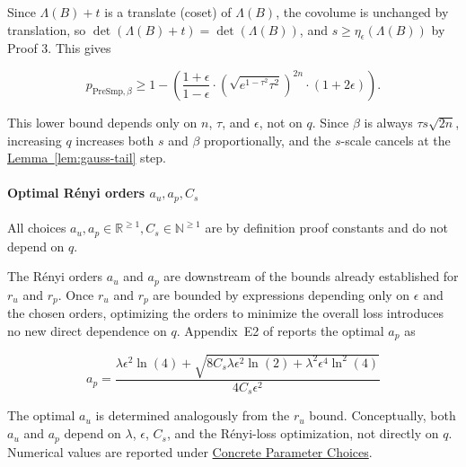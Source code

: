 Since \(\Lambda(B) + t\) is a translate (coset) of \(\Lambda(B)\), the
covolume is unchanged by translation, so
\(\det(\Lambda(B)+t) = \det(\Lambda(B))\), and
\(s \ge \eta_\epsilon(\Lambda(B))\) by Proof 3. This gives

\[
p_{\mathrm{PreSmp},\beta} \ge
1 -
\left(
\frac{1+\epsilon}{1-\epsilon}
\cdot
\left(
\sqrt{e^{1-\tau^2} \tau^2}
\right)^{2n}
\cdot
(1+2\epsilon)
\right).
\]


This lower bound depends only on \(n\), \(\tau\), and \(\epsilon\), not
on \(q\). Since \(\beta\) is always \(\tau s \sqrt{2n}\), increasing
\(q\) increases both \(s\) and \(\beta\) proportionally, and the
\(s\)-scale cancels at the \hyperref[lem:gauss-tail]{Lemma~\ref*{lem:gauss-tail}} step.

\paragraph{\texorpdfstring{Optimal Rényi orders
\(a_u, a_p, C_s\)}{Optimal Rényi orders a\_u, a\_p, C\_s}}\label{optimal-ruxe9nyi-orders-a_u-a_p-c_s}

All choices
\(a_u, a_p \in \mathbb{R}^{\ge 1}, C_s \in \mathbb{N}^{\ge 1}\) are by
definition proof constants and do not depend on \(q\).

The Rényi orders \(a_u\) and \(a_p\) are downstream of the bounds
already established for \(r_u\) and \(r_p\). Once \(r_u\) and \(r_p\)
are bounded by expressions depending only on \(\epsilon\) and the chosen
orders, optimizing the orders to minimize the overall loss introduces no
new direct dependence on \(q\).
Appendix~E2 of
\cite{Fouque2024CoreFalcon}
reports the optimal \(a_p\) as

\[
a_p =
\frac{
\lambda \epsilon^2 \ln(4)
+
\sqrt{
8C_s\lambda\epsilon^2\ln(2)
+
\lambda^2\epsilon^4\ln^2(4)
}
}{
4C_s\epsilon^2
}
\]

The optimal \(a_u\) is determined analogously from the \(r_u\) bound.
Conceptually, both \(a_u\) and \(a_p\) depend on \(\lambda\),
\(\epsilon\), \(C_s\), and the Rényi-loss optimization, not directly on
\(q\). Numerical values are reported under
\hyperref[concrete-parameter-choices]{Concrete Parameter Choices}.
